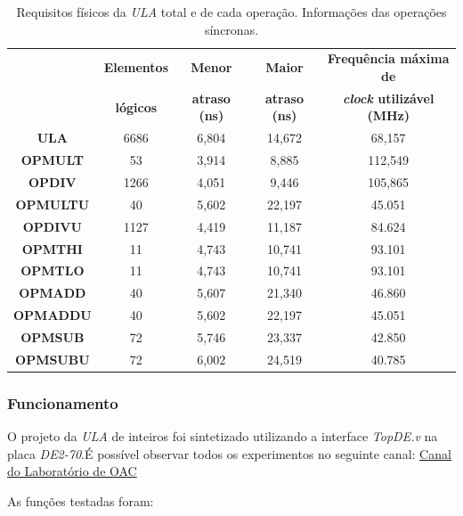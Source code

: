 \documentclass[12pt]{article}
\begin{document}
\begin{table}[H]
	\centering
	\begin{tabular}{|c|c|c|c|c|}
		\hline
		& \textbf{Elementos} & \textbf{Menor} & \textbf{Maior} & \textbf{Frequência máxima de} \\
		& \textbf{lógicos} & \textbf{atraso (ns)} &  \textbf{atraso (ns)} & \textbf{\textit{clock} utilizável (MHz)} \\
		\hline
		\textbf{ULA} & 6686 & 6,804 & 14,672 &  68,157 \\\hline
		\textbf{OPMULT} & 53 & 3,914 & 8,885 & 112,549 \\\hline
		\textbf{OPDIV} & 1266 & 4,051 & 9,446 & 105,865 \\\hline
		\textbf{OPMULTU} & 40 & 5,602 & 22,197 & 45.051 \\\hline
		\textbf{OPDIVU} & 1127 & 4,419 & 11,187 & 84.624 \\\hline
		\textbf{OPMTHI} & 11 & 4,743 & 10,741 & 93.101 \\\hline
		\textbf{OPMTLO} & 11 & 4,743 & 10,741 & 93.101 \\\hline
		\textbf{OPMADD} & 40 & 5,607 & 21,340 & 46.860 \\\hline
		\textbf{OPMADDU} & 40 & 5,602 & 22,197 & 45.051 \\\hline
		\textbf{OPMSUB} & 72 & 5,746 & 23,337 & 42.850 \\\hline
		\textbf{OPMSUBU}  & 72 & 6,002 & 24,519 & 40.785 \\\hline
	\end{tabular}
	\caption{Requisitos físicos da \textit{ULA} total e de cada operação. Informações das operações síncronas.}
	\label{tab:req22}
\end{table}

\subsubsection{Funcionamento}
\label{subsubsec:ulafunc}

O projeto da \textit{ULA} de inteiros foi sintetizado utilizando a interface \textit{TopDE.v} na placa \textit{DE2-70}.É possível observar todos os experimentos no seguinte canal: \href{https://www.youtube.com/channel/UCtyrFYKa4yLMnlFPTT5Mthw/videos?view_as=subscriber}{Canal do Laboratório de OAC} 

As funções testadas foram:
\end{document}

